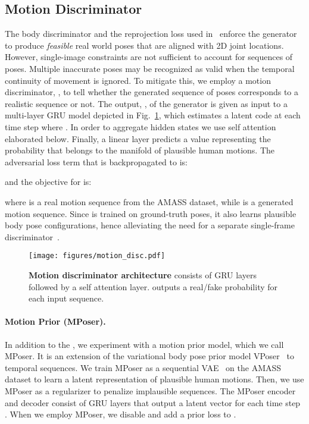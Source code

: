 \documentclass[10pt,twocolumn,letterpaper]{article}
\begin{document}
\subsection{Motion Discriminator}
\label{sec:motion_disc}
The body discriminator and the reprojection loss used in~\cite{kanazawa_hmr} enforce the generator to produce \textit{feasible} real world poses that are aligned with 2D joint locations.  However, single-image constraints are not sufficient to account for sequences of poses. Multiple inaccurate poses may be recognized as valid when the temporal continuity of movement is ignored. To mitigate this, we employ a motion discriminator, , to tell whether the generated sequence of poses corresponds to a realistic sequence or not. The output, , of the generator is given as input to a multi-layer GRU model  depicted in Fig.~\ref{fig:motion}, which estimates a latent code  at each time step  where . In order to aggregate hidden states  we use self attention~\cite{DBLP:journals/corr/BahdanauCB14} elaborated below. Finally, a linear layer predicts a value  representing the probability that  belongs to the manifold of plausible human motions. The adversarial loss term that is backpropagated to  is:  

and the objective for  is:

where  is a real motion sequence from the AMASS dataset, while  is a generated motion sequence. Since  is trained on ground-truth poses, it also learns plausible body pose configurations, hence alleviating the need for a separate single-frame discriminator~\cite{kanazawa_hmr}.
\begin{figure}[!htbp]
	\centering    
	\texttt{[image: figures/motion\_disc.pdf]}
	\caption{\textbf{Motion discriminator architecture}  consists of GRU layers followed by a self attention layer.  outputs a real/fake probability for each input sequence.}
	\label{fig:motion}
\end{figure}
\paragraph{Motion Prior (MPoser).} In addition to the , we experiment with a motion prior model, which we call MPoser. It is an extension of the variational body pose prior model VPoser~\cite{SMPL-X:2019} to temporal sequences. We train MPoser as a sequential VAE~\cite{kingma2013autoencoding} on the AMASS dataset to learn a latent representation of plausible human motions. Then, we use MPoser as a regularizer to penalize implausible sequences.  The MPoser encoder and decoder consist of GRU layers that output a latent vector  for each time step . When we employ MPoser, we disable  and add a prior loss  to . 
\end{document}
